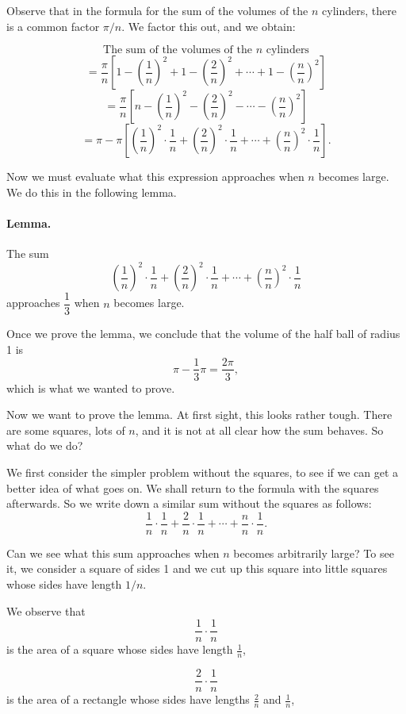\documentclass[12pt]{book} %
\begin{document}

Observe that in the formula for the sum of the volumes of the $n$ cylinders, there is a common factor $\pi/n$. We factor this out, and we obtain:

\[
\text{The sum of the volumes of the $n$ cylinders}
\]
\[
=\frac{\pi}{n}\left[1-\left(\frac1n\right)^2+1-\left(\frac2n\right)^2+\cdots+1-\left(\frac{n}{n}\right)^2\right]
\]
\[
=\frac{\pi}{n}\left[n-\left(\frac1n\right)^2-\left(\frac2n\right)^2-\cdots-\left(\frac{n}{n}\right)^2\right]
\]
\[
=\pi-\pi\left[\left(\frac1n\right)^2\cdot\frac1n+\left(\frac2n\right)^2\cdot\frac1n+\cdots+\left(\frac{n}{n}\right)^2\cdot\frac1n\right].
\]

Now we must evaluate what this expression approaches when $n$ becomes large. We do this in the following lemma.

\paragraph{Lemma.}
The sum
\[
\left(\frac1n\right)^2\cdot\frac1n
+\left(\frac2n\right)^2\cdot\frac1n
+\cdots
+\left(\frac{n}{n}\right)^2\cdot\frac1n
\]
approaches $\dfrac13$ when $n$ becomes large.

Once we prove the lemma, we conclude that the volume of the half ball of radius 1 is
\[
\pi-\frac13\pi=\frac{2\pi}{3},
\]
which is what we wanted to prove.

Now we want to prove the lemma. At first sight, this looks rather tough. There are some squares, lots of $n$, and it is not at all clear how the sum behaves. So what do we do?

We first consider the simpler problem without the squares, to see if we can get a better idea of what goes on. We shall return to the formula with the squares afterwards. So we write down a similar sum without the squares as follows:
\[
\frac1n\cdot\frac1n+\frac2n\cdot\frac1n+\cdots+\frac{n}{n}\cdot\frac1n.
\]

Can we see what this sum approaches when $n$ becomes arbitrarily large?
To see it, we consider a square of sides 1 and we cut up this square into little squares whose sides have length $1/n$.


We observe that
\[
\frac1n\cdot\frac1n
\]
is the area of a square whose sides have length $\frac1n$,

\[
\frac2n\cdot\frac1n
\]
is the area of a rectangle whose sides have lengths $\frac2n$ and $\frac1n$,
\end{document}
